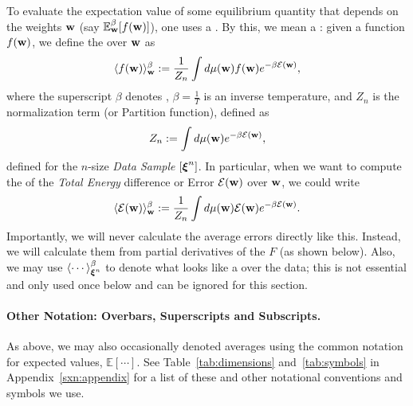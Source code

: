 To evaluate the expectation value of some equilibrium quantity that depends on the weights ${\mathbf{w}}$ (say $\mathbb{E}^{\beta}_{{\mathbf{w}}}[f({\mathbf{w}})]$), one uses a \ThermalAverage.
By this, we mean a \emph{\BoltzmannWeightedAverage}: given a function $f({\mathbf{w}})$,
we define the \ThermalAverage over ${\mathbf{w}}$ as
\begin{align}
\label{eqn:thrmavg}
\langle f({\mathbf{w}})\rangle_{{\mathbf{w}}}^{{\beta}}:=\dfrac{1}{Z_{n}}\int d\mu({\mathbf{w}}) f({\mathbf{w}})e^{-\beta \mathcal{E}(\mathbf{w})}  ,
\end{align}
where the superscript $\beta$ denotes \ThermalAverage,
$\beta=\frac{1}{T}$ is an inverse temperature, and 
$Z_{n}$ is the normalization term (or Partition function), defined as
\begin{align}
\label{eqn:Zwn}
Z_{n}:=\int d\mu({\mathbf{w}}) e^{-\beta \mathcal{E}(\mathbf{w})},
\end{align}
defined for the $n$-size \emph{Data Sample} $[\boldsymbol{\xi}^{n}]$.
%
In particular, when we want to compute the \ThermalAverage of the \emph{Total Energy} difference or Error
$\mathcal{E}(\mathbf{w})$ over ${\mathbf{w}}$, we could write
\begin{align}
\label{eqn:Detot}
\langle \mathcal{E}(\mathbf{w}) \rangle^{\beta}_{{\mathbf{w}}}:=\dfrac{1}{Z_{n}}\int d\mu({\mathbf{w}}) \mathcal{E}(\mathbf{w}) e^{-\beta \mathcal{E}(\mathbf{w})} .
\end{align}
Importantly, we will never calculate the average errors directly like this.
Instead, we will calculate them from partial derivatives of the \FreeEnergy $F$ (as shown below).
Also, we may use $\langle \cdots \rangle^{\beta}_{\boldsymbol{\xi}^{n}}$ to denote what looks like a \ThermalAverage over the data;
this is not essential and only used once below and can be ignored for this section.

\paragraph{Other Notation: Overbars, Superscripts and Subscripts.}
As above, we may also occasionally denoted averages using the common notation for expected values, $\mathbb{E}[\cdots]$.
See Table~\ref{tab:dimensions} and~\ref{tab:symbols} in Appendix~\ref{sxn:appendix} for a list of these and other notational conventions and symbols we use.

